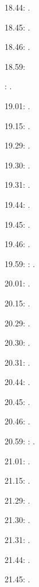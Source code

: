 \documentclass[italian]{article}
\begin{document}
18.44:     .

18.45:     .

18.46:     .

18.59:     

:    .

19.01:     . 

19.15:     . 

19.29:     . 

19.30:     .

19.31:     .

19.44:     .

19.45:     .

19.46:     .

19.59:     
:    .

20.01:     . 

20.15:     . 

20.29:     . 

20.30:     .

20.31:     .

20.44:     .

20.45:     .

20.46:     .

20.59:     
:    .

21.01:     . 

21.15:     . 

21.29:     . 

21.30:     .

21.31:     .

21.44:     .

21.45:     .
\end{document}
